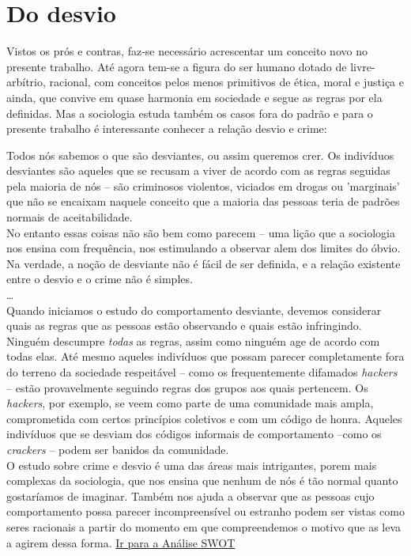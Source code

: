 \documentclass[
	12pt,				%
	openright,			%
	twoside,			%
	a4paper,			%
	chapter=TITLE,		%
	section=TITLE,		%
	subsection=TITLE,	%
	subsubsection=TITLE,%
	spanish,            %
	english,			%
	brazil				%
	]{abntex2}
\begin{document}
\section{Do desvio}
Vistos os prós e contras, faz-se necessário acrescentar um conceito novo no presente trabalho. Até agora tem-se a figura do ser
humano dotado de livre-arbítrio, racional, com conceitos pelos menos primitivos de ética, moral e justiça e ainda, que convive em quase harmonia em sociedade e segue as regras por ela definidas.
Mas a sociologia estuda também os casos fora do padrão e para o presente trabalho é interessante conhecer a relação desvio e crime:
\hypertarget{Gid1}{}
\begin{citacao}
Todos nós sabemos o que são desviantes, ou assim queremos crer. Os indivíduos desviantes são aqueles que se recusam a viver de acordo com as regras seguidas pela maioria de nós -- são criminosos violentos, viciados em drogas ou 'marginais' que não se encaixam naquele conceito que a maioria das pessoas teria de padrões normais de aceitabilidade. \\
No entanto essas coisas não são bem como parecem -- uma lição que a sociologia nos ensina com frequência, nos estimulando a observar 
alem dos limites do óbvio. Na verdade, a noção de desviante não é fácil de ser definida, e a relação existente entre o desvio e o crime não é simples.\\
\ldots\\
Quando iniciamos o estudo do comportamento desviante, devemos considerar quais as regras que as pessoas estão observando e quais estão infringindo. Ninguém descumpre \textit{todas} as regras, assim como ninguém age de acordo com todas elas. Até mesmo aqueles indivíduos que possam parecer completamente fora do terreno da sociedade respeitável -- como os frequentemente difamados \textit{hackers} -- estão provavelmente seguindo regras dos grupos aos quais pertencem. Os \textit{hackers},  por exemplo, se veem como parte de uma comunidade mais ampla, comprometida com certos princípios coletivos e com um código de honra. Aqueles indivíduos que se desviam dos códigos informais de comportamento --como os \textit{crackers} -- podem ser banidos da comunidade.\\
O estudo sobre crime e desvio é uma das áreas mais intrigantes, porem mais complexas da sociologia, que nos ensina que nenhum de nós é tão normal quanto gostaríamos de imaginar. Também nos ajuda a observar que as pessoas cujo comportamento possa parecer incompreensível  ou estranho podem ser vistas como seres racionais a partir do momento em que compreendemos o motivo que as leva a agirem dessa forma. \cite[p. ~172-173]{Giddens} \hyperlink{W10}{Ir para a Análise SWOT}
\end{citacao}
\end{document}
